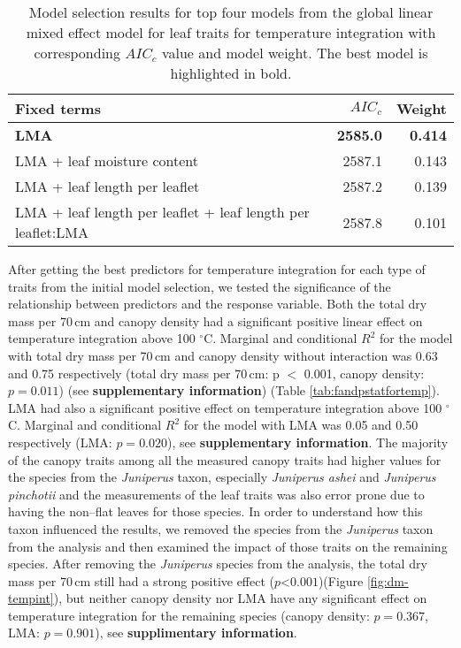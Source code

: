 \documentclass{bmcart}
\begin{document}
\begin{table}
  \centering
  \caption{Model selection results for top four models from the global linear
    mixed effect model for leaf traits for temperature integration with
    corresponding $AIC_{c}$ value and model weight. The best model is highlighted in bold.}
  \begin{tabular}{lrr}
    \toprule
    \textbf{Fixed terms} & $AIC_{c}$ & \textbf{Weight}\\
    \midrule
    \textbf{LMA} & \textbf{2585.0} & \textbf{0.414} \\
    LMA + leaf moisture content & 2587.1     & 0.143    \\
    LMA + leaf length per leaflet                                 & 2587.2 & 0.139    \\
    LMA + leaf length per leaflet + leaf length per leaflet:LMA                              & 2587.8     & 0.101    \\
    \bottomrule
  \end{tabular}
  \label{tab:leaf_models}
\end{table}

After getting the best predictors for temperature integration for each type of traits from the initial model selection, we tested the significance of the relationship  between predictors and the response variable. Both the total dry mass per 70\,cm and canopy density had a significant positive linear effect  
on temperature integration above 100 $^{\circ}$C. Marginal and conditional $R^2$ for the model with total dry mass per 70\,cm and canopy density without interaction was  0.63 and 0.75 respectively (total dry mass per 70\,cm: p $<$ 0.001, canopy density: $p = 0.011$) (see \textbf{supplementary information}) (Table \ref{tab:fandpstatfortemp}). LMA had also a significant positive effect on temperature integration above 100 $^{\circ}$C. Marginal  and conditional $R^2$ for the model with LMA was 0.05 and 0.50 respectively (LMA: $p = 0.020$), see \textbf{supplementary information}. The majority of the canopy traits among all the measured canopy traits had higher values for the species from the \emph{Juniperus} taxon, especially \emph{Juniperus ashei} and \emph{Juniperus pinchotii} and the measurements of the leaf traits was also error prone due to having the non--flat leaves for those species. In order to understand how this taxon influenced the results, we removed the species from the \emph{Juniperus} taxon from the analysis and then examined the impact of those traits on the remaining species. After removing the \emph{Juniperus} species from the analysis, the total dry mass per 70\,cm still had a strong positive effect ($p $<$ 0.001$)(Figure \ref{fig:dm-tempint}), but neither canopy density nor LMA have any significant effect on temperature integration for the remaining species (canopy density: $p = 0.367$, LMA: $p = 0.901$), see \textbf{supplimentary information}. 
\end{document}
